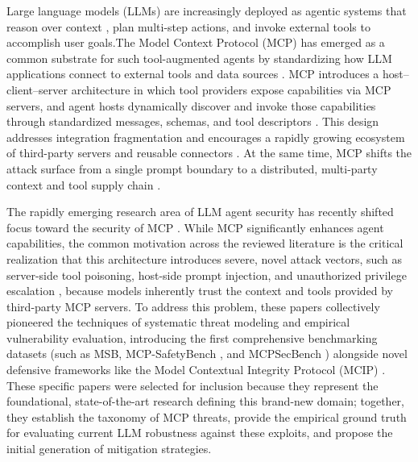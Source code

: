 
Large language models (LLMs) are increasingly deployed as agentic  systems that reason over context \cite{giurgiu2025supporting}, plan multi-step actions, and invoke external tools \cite{wang2025agent} to accomplish user goals.The Model Context Protocol (MCP) has emerged as a common substrate for such tool-augmented agents by standardizing how LLM applications connect to external tools and data sources \cite{anthropic_mcp_2024}.
MCP introduces a host--client--server architecture in which tool providers expose capabilities via MCP servers, and agent hosts dynamically discover and invoke those capabilities through standardized messages, schemas, and tool descriptors \cite{mcp2025spec}. This design addresses integration fragmentation and encourages a rapidly growing ecosystem of third-party servers and reusable connectors \cite{anthropic_mcp_2024}. At the same time, MCP shifts the attack surface from a single prompt boundary to a distributed, multi-party context and tool supply chain \cite{errico2025securing}.



The rapidly emerging research area of LLM agent security has recently shifted focus toward the security of MCP \cite{jing2025mcip}. While MCP significantly enhances agent capabilities, the common motivation across the reviewed literature is the critical realization that this architecture introduces severe, novel attack vectors, such as server-side tool poisoning, host-side prompt injection, and unauthorized privilege escalation \cite{zong2025mcp}, because models inherently trust the context and tools provided by third-party MCP servers. To address this problem, these papers collectively pioneered the techniques of systematic threat modeling and empirical vulnerability evaluation, introducing the first comprehensive benchmarking datasets (such as MSB\cite{zhang2025msb}, MCP-SafetyBench \cite{zong2025mcp}, and MCPSecBench \cite{yang2025mcpsecbench}) alongside novel defensive frameworks like the Model Contextual Integrity Protocol (MCIP) \cite{jing2025mcip}. These specific papers were selected for inclusion because they represent the foundational, state-of-the-art research defining this brand-new domain; together, they establish the taxonomy of MCP threats, provide the empirical ground truth for evaluating current LLM robustness against these exploits, and propose the initial generation of mitigation strategies.
